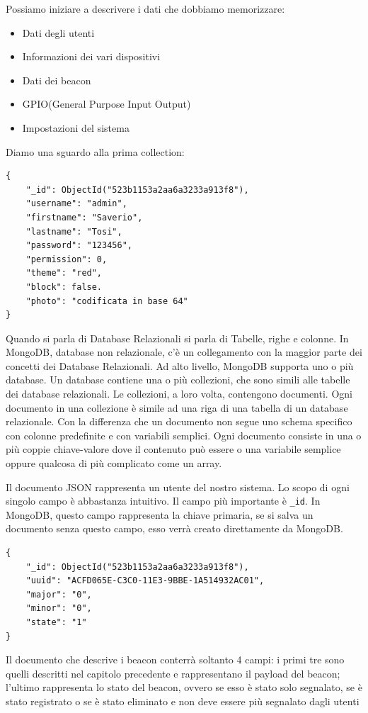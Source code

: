 Possiamo iniziare a descrivere i dati che dobbiamo memorizzare:
\begin{itemize}
\item Dati degli utenti
\item Informazioni dei vari dispositivi
\item Dati dei beacon
\item GPIO(General Purpose Input Output)
\item Impostazioni del sistema
\end{itemize}
Diamo una sguardo alla prima collection:
\begin{lstlisting}[caption={User collection}, style=javaScriptCode]
{
    "_id": ObjectId("523b1153a2aa6a3233a913f8"),
    "username": "admin",
    "firstname": "Saverio",
    "lastname": "Tosi",
    "password": "123456",
    "permission": 0,
    "theme": "red",
    "block": false.
    "photo": "codificata in base 64"
}
\end{lstlisting}
Quando si parla di Database Relazionali si parla di Tabelle, righe e colonne.
In MongoDB, database non relazionale, c'è un collegamento con la maggior parte dei concetti dei Database Relazionali. Ad alto livello, MongoDB supporta uno o più database. 
Un database contiene una o più collezioni, che sono simili alle tabelle dei database relazionali. Le collezioni, a loro volta, contengono documenti. 
Ogni documento in una collezione è simile ad una riga di una tabella di un database relazionale. Con la differenza che un documento non segue uno schema specifico con colonne predefinite e con variabili semplici. 
Ogni documento consiste in una o più coppie chiave-valore dove il contenuto può essere o una variabile semplice oppure qualcosa di più complicato come un array.

Il documento JSON rappresenta un utente del nostro sistema. Lo scopo di ogni singolo campo è abbastanza intuitivo. Il campo più importante è \texttt{\_id}. 
In MongoDB, questo campo rappresenta la chiave primaria, se si salva un documento senza questo campo, esso verrà creato direttamente da MongoDB.

\begin{lstlisting}[caption={Beacon collection}, style=javaScriptCode]
{
    "_id": ObjectId("523b1153a2aa6a3233a913f8"),
    "uuid": "ACFD065E-C3C0-11E3-9BBE-1A514932AC01",
    "major": "0",
    "minor": "0",
    "state": "1"
}
\end{lstlisting}

Il documento che descrive i beacon conterrà soltanto 4 campi:
i primi tre sono quelli descritti nel capitolo precedente e rappresentano il payload del beacon; l'ultimo rappresenta lo stato del beacon, ovvero se esso è stato solo segnalato, se è stato registrato o se è stato eliminato e non deve essere più segnalato dagli utenti

